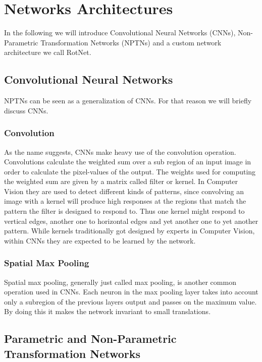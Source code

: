 \documentclass{llncs}
\begin{document}
\section{Networks Architectures} In the following we will introduce Convolutional Neural Networks (CNNs), Non-Parametric Transformation Networks (NPTNs) and a custom network architecture we call RotNet.

\subsection{Convolutional Neural Networks}
NPTNs can be seen as a generalization of CNNs. For that reason we will briefly discuss CNNs. 
\subsubsection{Convolution}
As the name suggests, CNNs make heavy use of the convolution operation. Convolutions
 calculate the weighted sum over a sub region of an input image in order to calculate the pixel-values of the output. The weights used for computing the weighted sum are given by a matrix called filter or kernel. In Computer Vision they are used to detect different kinds of patterns, since convolving an image with a kernel will produce high responses at the regions that match the pattern the filter is designed to respond to. Thus one kernel might respond to vertical edges, another  one to horizontal edges and yet another one to yet another pattern. While kernels traditionally got designed by experts in Computer Vision, within CNNs they are expected to be learned by the network.


\subsubsection{Spatial Max Pooling}
Spatial max pooling, generally just called max pooling, is another common operation used in CNNs.
Each neuron in the max pooling layer takes into account only a subregion of the previous
layers output and passes on the maximum value. By doing this it makes the network invariant to small translations. 



\subsection{Parametric and Non-Parametric Transformation Networks}
\end{document}
